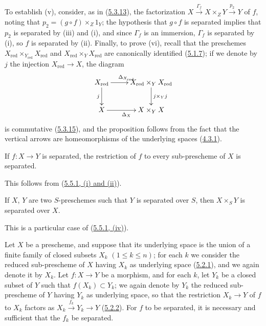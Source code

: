 To establish (v), consider, as in
(\hyperref[I.5.3.13]{5.3.13}), the factorization
$X\xrightarrow{\Gamma_f}X\times_Z Y\xrightarrow{p_2}Y$ of $f$, noting
that $p_2=(g\circ f)\times_Z 1_Y$; the hypothesis that $g\circ f$ is separated
implies that $p_2$ is separated by (iii) and (i), and since $\Gamma_f$ is an
immersion, $\Gamma_f$ is separated by (i), so $f$ is separated by (ii).
Finally, to prove (vi), recall that the preschemes
$X_{\mathrm{red}}\times_{Y_{\mathrm{red}}}X_{\mathrm{red}}$ and
$X_{\mathrm{red}}\times_Y X_{\mathrm{red}}$ are canonically identified
(\hyperref[I.5.1.7]{5.1.7}); if we denote by $j$ the injection
$X_{\mathrm{red}}\to X$, the diagram
\[
  \xymatrix{
    X_{\mathrm{red}}\ar[r]^{\Delta_{X_{\mathrm{red}}}}\ar[d]_j &
    X_{\mathrm{red}}\times_Y X_{\mathrm{red}}\ar[d]^{j\times_Y j}\\
    X\ar[r]_{\Delta_X} & X\times_Y X
  }
\]
is commutative (\hyperref[I.5.3.15]{5.3.15}), and the proposition follows
from the fact that the vertical arrows are homeomorphisms of the underlying
spaces (\hyperref[I.4.3.1]{4.3.1}).

\begin{corollary}[5.5.2]
\label{I.5.5.2}
If $f:X\to Y$ is separated, the restriction of $f$ to every sub-prescheme of
$X$ is separated.
\end{corollary}

This follows from (\hyperref[I.5.5.1]{5.5.1, (i) and (ii)}).

\begin{corollary}[5.5.3]
\label{I.5.5.3}
If $X$, $Y$ are two $S$-preschemes such that $Y$ is separated over
$S$, then $X\times_S Y$ is separated over $X$.
\end{corollary}

This is a particular case of (\hyperref[I.5.5.1]{5.5.1, (iv)}).

\begin{proposition}[5.5.4]
\label{I.5.5.4}
Let $X$ be a prescheme, and suppose that its underlying space is the union of
a finite family of closed subsets $X_k$ $(1\leq k\leq n)$; for each $k$ we
consider the reduced sub-prescheme of $X$ having $X_k$ as underlying space
(\hyperref[I.5.2.1]{5.2.1}), and we again denote it by $X_k$. Let
$f:X\to Y$ be a morphism, and for each $k$, let $Y_k$ be a closed subset of
$Y$ such that $f(X_k)\subset Y_k$; we again denote by $Y_k$ the reduced
sub-prescheme of $Y$ having $Y_k$ as underlying space, so that the restriction
$X_k\to Y$ of $f$ to $X_k$ factors as
$X_k\xrightarrow{f_k}Y_k\to Y$ (\hyperref[I.5.2.2]{5.2.2}). For $f$
to be separated, it is necessary and sufficient that the $f_k$ be separated.
\end{proposition}

